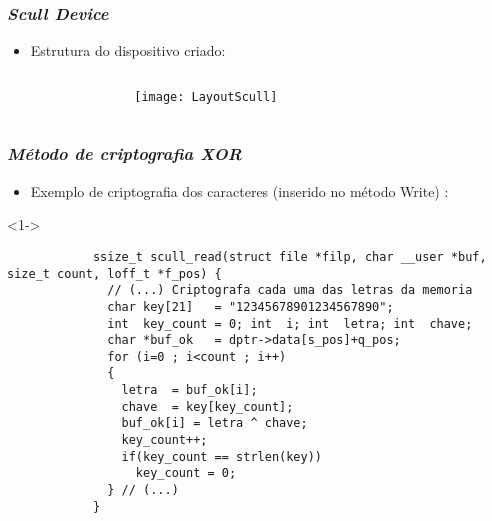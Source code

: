 \begin{frame}
	\frametitle{\textit{Scull Device}}
	\begin{itemize}
		\item<1-> Estrutura do dispositivo criado:
	\end{itemize}
	\begin{columns}[T]
		\begin{column}{.15\textwidth}
		\end{column}
		\begin{column}{.7\textwidth}
			\uncover<1-> {\texttt{[image: LayoutScull]} \tiny{\cite{LinuxDrivers}}}
		\end{column}
		\begin{column}{.15\textwidth}
		\end{column}
	\end{columns}
\end{frame}


\begin{frame}[fragile]
	\frametitle{\textit{Método de criptografia XOR}}
	
	\begin{itemize}
		\item<1-> Exemplo de criptografia dos caracteres (inserido no método Write) \cite{Codecall_XOR}:
	\end{itemize}
	
	\lstset{language=C}

	\begin{block}<1->{}
		\begin{lstlisting}
			ssize_t scull_read(struct file *filp, char __user *buf, size_t count, loff_t *f_pos) {
			  // (...) Criptografa cada uma das letras da memoria
			  char key[21]   = "12345678901234567890";
			  int  key_count = 0; int  i; int  letra; int  chave;
			  char *buf_ok   = dptr->data[s_pos]+q_pos;
			  for (i=0 ; i<count ; i++)
			  {
			    letra  = buf_ok[i];
			    chave  = key[key_count];
			    buf_ok[i] = letra ^ chave;
			    key_count++;
			    if(key_count == strlen(key))
			      key_count = 0;
			  } // (...)
			}
		\end{lstlisting}
	\end{block}

\end{frame}


